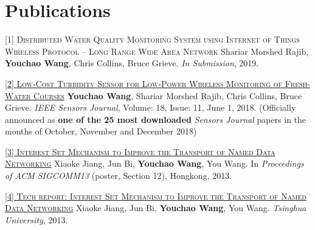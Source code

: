 \documentclass[11pt,a4paper]{moderncv}
\begin{document}
\vspace*{-0.0cm}

\section{Publications}

\textsc{[1] Distributed Water Quality Monitoring System using Internet of Things Wireless Protocol – Long Range Wide Area Network}
\newline  Shariar Morshed Rajib, \textbf{Youchao Wang}, Chris Collins, Bruce Grieve. \textit{In Submission}, 2019.

\href{https://ieeexplore.ieee.org/document/8337739}{\textsc{[2] Low-Cost Turbidity Sensor for Low-Power Wireless Monitoring of Fresh-Water Courses}}
\newline  \textbf{Youchao Wang}, Shariar Morshed Rajib, Chris Collins, Bruce Grieve. \textit{IEEE Sensors Journal}, Volume: 18, Issue: 11, June 1, 2018. (Officially announced as \textbf{one of the 25 most downloaded} \textit{Sensors Journal} papers in the months of October, November and December 2018)

\href{https://ndnsim.net/2.3/ndnsim-research-papers.html}{\textsc{[3] Interest Set Mechanism to Improve the Transport of Named Data Networking}}
\newline  Xiaoke Jiang, Jun Bi, \textbf{Youchao Wang}, You Wang. In \textit{Proceedings of ACM SIGCOMM13} (poster, Section 12), Hongkong, 2013. 

\href{http://netarchlab.tsinghua.edu.cn/~shock/THU-NetArchLab-ICN-TR-ISTSET-20130517.pdf}{\textsc{[4] Tech report: Interest Set Mechanism to Improve the Transport of Named Data Networking}}
\newline  Xiaoke Jiang, Jun Bi, \textbf{Youchao Wang}, You Wang.\textit{ Tsinghua University}, 2013.  
\end{document}
